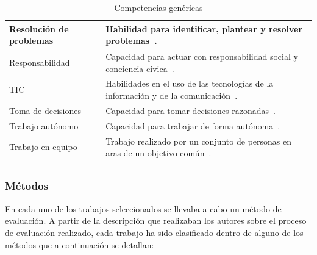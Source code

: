 \begin{landscape}
\begin{center}
\begin{longtable}{| L{6cm} | L{16cm} |}
    \hline
    Resolución de problemas & Habilidad para identificar, plantear y resolver problemas~\cite{gonzalez2005tuning}. \\
    \hline
    Responsabilidad & Capacidad para actuar con responsabilidad social y conciencia cívica~\cite{gonzalez2005tuning}. \\
    \hline
    TIC & Habilidades en el uso de las tecnologías de la información y de la comunicación~\cite{gonzalez2005tuning}. \\
    \hline
    Toma de decisiones & Capacidad para tomar decisiones razonadas~\cite{gonzalez2005tuning}. \\
    \hline
    Trabajo autónomo & Capacidad para trabajar de forma autónoma~\cite{gonzalez2005tuning}. \\
    \hline
    Trabajo en equipo & Trabajo realizado por un conjunto de personas en aras de un objetivo común~\cite{dixon1992teamwork}. \\
    \hline
\caption{Competencias genéricas}
\label{tab:CompetenciasGenericas}
\end{longtable} 
\end{center}
\end{landscape}
\pagestyle{fancy}

\subsubsection*{Métodos}
\label{sec:methods}
En cada uno de los trabajos seleccionados se llevaba a cabo un método de evaluación. A partir de la descripción que realizaban los autores sobre el proceso de evaluación realizado, cada trabajo ha sido clasificado dentro de alguno de los métodos que a continuación se detallan:


